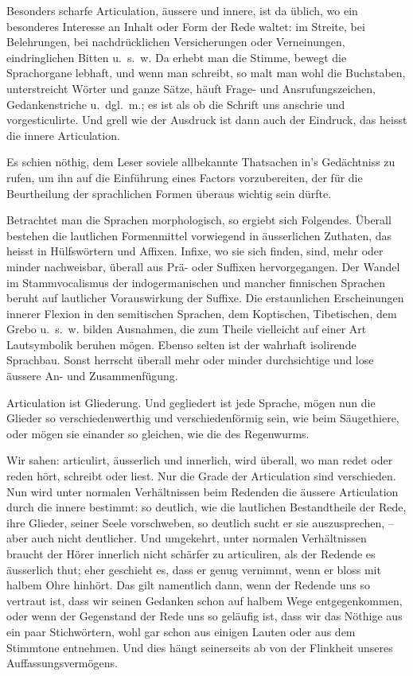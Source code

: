 \largerpage[-1]Besonders scharfe Articulation, äussere und innere, ist da üblich, wo ein besonderes Interesse an Inhalt oder Form der Rede waltet: im Streite, bei Belehrungen, bei nachdrücklichen Versicherungen oder Verneinungen, eindringlichen Bitten u.~s.~w. Da erhebt man die Stimme, \label{fp.413} bewegt die Sprachorgane lebhaft, und wenn man schreibt, so malt man wohl die Buchstaben, unterstreicht Wörter und ganze Sätze, häuft Frage- und Ansrufungszeichen, Gedankenstriche u.~dgl.~m.; es ist als ob die Schrift uns anschrie und vorgesticulirte. Und grell wie der Ausdruck ist dann auch der Eindruck, das heisst die innere Articulation.

Es schien nöthig, dem Leser soviele allbekannte Thatsachen in’s Gedächtniss zu rufen, um ihn auf die Einführung eines Factors vorzubereiten, der für die Beurtheilung der sprachlichen Formen überaus wichtig sein dürfte.

\largerpage
Betrachtet man die Sprachen morphologisch, so ergiebt sich Folgendes. Überall bestehen die lautlichen Formenmittel vorwiegend in äusserlichen Zuthaten, das heisst in Hülfswörtern und Affixen. Infixe, wo sie sich finden, sind, mehr oder minder nachweisbar, überall aus Prä- oder Suffixen hervorgegangen. Der Wandel im Stammvocalismus der indogermanischen und mancher finnischen Sprachen beruht auf lautlicher Vorauswirkung der Suffixe. Die erstaunlichen Erscheinungen innerer Flexion in den semitischen Sprachen, dem Koptischen, Tibetischen, dem Grebo u.~s.~w. bilden Ausnahmen, die zum Theile vielleicht auf einer Art Lautsymbolik beruhen mögen. Ebenso selten ist der wahrhaft isolirende Sprachbau. Sonst herrscht überall mehr oder minder durchsichtige und lose äussere An- und Zusammenfügung.

Articulation ist Gliederung. Und gegliedert ist jede Sprache, mögen nun die Glieder so verschiedenwerthig und verschiedenförmig sein, wie beim Säugethiere, oder mögen sie einander so gleichen, wie die des Regenwurms.

Wir sahen: articulirt, äusserlich und innerlich, wird überall, wo man redet oder reden hört, schreibt oder liest. Nur die Grade der Articulation sind verschieden. Nun wird unter normalen Verhältnissen beim Redenden die äussere Articulation durch die innere bestimmt: so deutlich, wie die lautlichen Bestand\label{sp.435}theile der Rede, ihre Glieder, seiner Seele vorschweben, so deutlich sucht er sie auszusprechen, – aber auch nicht deutlicher. Und umgekehrt, unter normalen Verhältnissen braucht der Hörer innerlich nicht schärfer zu articuliren, als der Redende es äusserlich thut; eher geschieht es, dass er genug vernimmt, wenn er bloss mit halbem Ohre hinhört. Das gilt namentlich dann, wenn der Redende uns so vertraut ist, dass wir seinen Gedanken schon auf halbem Wege entgegenkommen, oder wenn der Gegenstand der Rede uns so geläufig ist, \label{fp.414} dass wir das Nöthige aus ein paar Stichwörtern, wohl gar schon aus einigen Lauten oder aus dem Stimmtone entnehmen. Und dies hängt seinerseits ab von der Flinkheit unseres Auffassungsvermögens.

